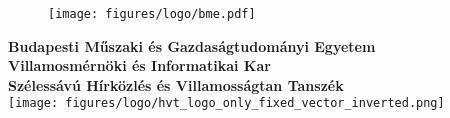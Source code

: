 \begin{titlepage}

    \begin{figure}
    \centering
    \texttt{[image: figures/logo/bme.pdf]}
    \end{figure}
    
    \centering
    \textbf{Budapesti Műszaki és Gazdaságtudományi Egyetem}\\
    \textbf{Villamosmérnöki és Informatikai Kar}\\
    \textbf{Szélessávú Hírközlés és Villamosságtan Tanszék}\\
    \vspace{5mm}
    \texttt{[image: figures/logo/hvt\_logo\_only\_fixed\_vector\_inverted.png]}  \\
    \vspace{47mm}
    \Huge
    \dokumentumcim\\
    \vspace{57mm}
    \Large
    \thetitle \\
    \vspace{10mm}
    \Large
    \textbf{\theauthor}\\
    \vspace{10mm}
    \the\year
    
    
    \end{titlepage}